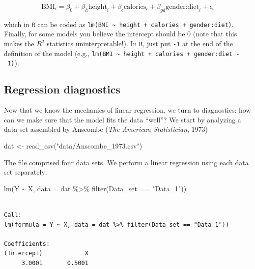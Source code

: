 \documentclass[
  letterpaper,
  DIV=11,
  numbers=noendperiod]{scrreprt}
\newenvironment{Shaded}{\begin{snugshade}}{\end{snugshade}}
\newcommand{\AttributeTok}[1]{\textcolor[rgb]{0.40,0.45,0.13}{#1}}
\newcommand{\FunctionTok}[1]{\textcolor[rgb]{0.28,0.35,0.67}{#1}}
\newcommand{\NormalTok}[1]{\textcolor[rgb]{0.00,0.23,0.31}{#1}}
\newcommand{\OtherTok}[1]{\textcolor[rgb]{0.00,0.23,0.31}{#1}}
\newcommand{\SpecialCharTok}[1]{\textcolor[rgb]{0.37,0.37,0.37}{#1}}
\newcommand{\StringTok}[1]{\textcolor[rgb]{0.13,0.47,0.30}{#1}}
\begin{document}
\[
\text{BMI}_i = \beta_0 + \beta_h \text{height}_i + \beta_c \text{calories}_i + \beta_{gd}\text{gender:diet}_i + \epsilon_i
\]

which in \texttt{R} can be coded as
\texttt{lm(BMI\ \textasciitilde{}\ height\ +\ calories\ +\ gender:diet)}.
Finally, for some models you believe the intercept should be 0 (note
that this makes the \(R^2\) statistics uninterpretable!). In \texttt{R},
just put \texttt{-1} at the end of the definition of the model (e.g.,
\texttt{lm(BMI\ \textasciitilde{}\ height\ +\ calories\ +\ gender:diet\ -\ 1)}).

\hypertarget{regression-diagnostics}{%
\subsection{Regression diagnostics}\label{regression-diagnostics}}

Now that we know the mechanics of linear regression, we turn to
diagnostics: how can we make sure that the model fits the data ``well''?
We start by analyzing a data set assembled by Anscombe (\emph{The
American Statistician}, 1973)

\begin{Shaded}
\begin{Highlighting}[]
\NormalTok{dat }\OtherTok{\textless{}{-}} \FunctionTok{read\_csv}\NormalTok{(}\StringTok{"data/Anscombe\_1973.csv"}\NormalTok{)}
\end{Highlighting}
\end{Shaded}

The file comprised four data sets. We perform a linear regression using
each data set separately:

\begin{Shaded}
\begin{Highlighting}[]
\FunctionTok{lm}\NormalTok{(Y }\SpecialCharTok{\textasciitilde{}}\NormalTok{ X, }\AttributeTok{data =}\NormalTok{ dat }\SpecialCharTok{\%\textgreater{}\%} \FunctionTok{filter}\NormalTok{(Data\_set }\SpecialCharTok{==} \StringTok{"Data\_1"}\NormalTok{))}
\end{Highlighting}
\end{Shaded}

\begin{verbatim}

Call:
lm(formula = Y ~ X, data = dat %>% filter(Data_set == "Data_1"))

Coefficients:
(Intercept)            X  
     3.0001       0.5001  
\end{verbatim}
\end{document}
